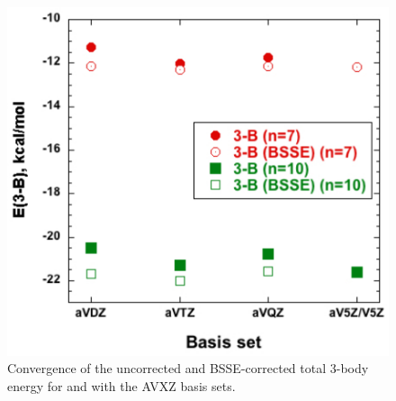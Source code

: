 \begin{figure}[h]
\uwsinglespace
\centering\includegraphics[width=.7\textwidth]{Figures/Chapter_2/E_3B_7_10.pdf}
\caption[Convergence of the uncorrected and BSSE-corrected total 3-body energy for  and  with the AVXZ basis sets.]{Convergence of the uncorrected and BSSE-corrected total 3-body energy for  and  with the AVXZ basis sets.}
\label{fig:MBE_I_F7}
\end{figure}